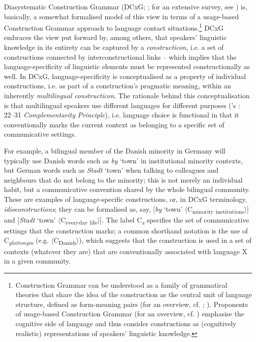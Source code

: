 \documentclass[output=paper]{langsci/langscibook}
\begin{document}
Diasystematic Construction Grammar (DCxG; \citealt{Hoder.2012, Hoder.2014, Hoder.2018, Hoder.2019b}; for an extensive survey, see \citealt{Hoder.2018}) is, basically, a somewhat formalised model of this view in terms of a usage-based Construction Grammar approach to language contact situations.\footnote{Construction Grammar can be understood as a family of grammatical theories that share the idea of the construction as the central unit of language structure, defined as form-meaning pairs (for an overview, cf. \citealt{Hoffmann.2013}; \citealt{Hilpert.2019}). Proponents of usage-based Construction Grammar (for an overview, cf. \citealt{Diessel.2019}) emphasise the cognitive side of language and thus consider constructions as (cognitively realistic) representations of speakers’ linguistic knowledge.} DCxG embraces the view put forward by, among others, \citet[18]{Goldberg.2006} that speakers’ linguistic knowledge in its entirety can be captured by a \textit{constructicon}, i.e. a set of constructions connected by interconstructional links – which implies that the language-specificity of linguistic elements must be represented constructionally as well. In DCxG, language-specificity is conceptualised as a property of individual constructions, i.e. as part of a construction’s pragmatic meaning, within an inherently \textit{multilingual constructicon}. The rationale behind this conceptualisation is that multilingual speakers use different languages for different purposes (\citeauthor{Grosjean.2008}'s \citeyear{Grosjean.2008}: 22--31 \textit{Complementarity Principle}), i.e. language choice is functional in that it conventionally marks the current context as belonging to a specific set of communicative settings.

For example, a bilingual member of the Danish minority in Germany will typically use Danish words such as \textit{by} ‘town’ in institutional minority contexts, but German words such as \textit{Stadt} ‘town’ when talking to colleagues and neighbours that do not belong to the minority; this is not merely an individual habit, but a communicative convention shared by the whole bilingual community. These are examples of language-specific constructions, or, in DCxG terminology, \textit{idioconstructions}; they can be formalised as, say, {[}\textit{by} ‘town’ $\langle$C\textsubscript{minority institutions}$\rangle${]} and {[}\textit{Stadt} ‘town’ $\langle$C\textsubscript{everyday life}$\rangle${]}. The label C\textit{\textsubscript{x}} specifies the set of communicative settings that the construction marks; a common shorthand notation is the use of C\textit{\textsubscript{glottonym}} (e.g. $\langle$C\textsubscript{Danish}$\rangle$), which suggests that the construction is used in a set of contexts (whatever they are) that are conventionally associated with language X in a given community.
\end{document}
